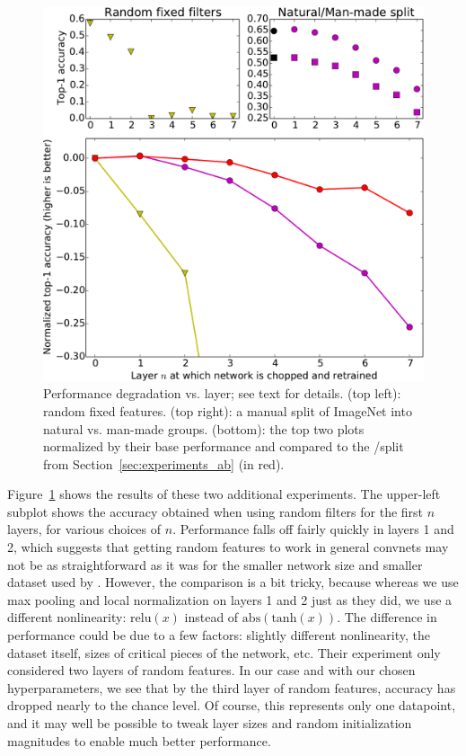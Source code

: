 \begin{figure}[t]
\begin{center}
\includegraphics[width=.65\linewidth]{plots/result_random_nm_combined_crop.pdf}
\end{center}
\caption{Performance degradation vs. layer; see text for details. (top left): random fixed features. (top right): a manual split of ImageNet into natural vs. man-made groups. (bottom): the top two plots normalized by their base performance and compared to the \dA/\dB split from Section~\ref{sec:experiments_ab} (in red).}
\label{fig:random_and_nm}
\end{figure}

Figure~\ref{fig:random_and_nm} shows the results of these two additional experiments. The upper-left subplot shows the accuracy obtained when using random filters for the first $n$ layers, for various choices of $n$. Performance falls off fairly quickly in layers 1 and 2, which suggests that getting random features to work in general convnets may not be as straightforward as it was for the smaller network size and smaller dataset used by \cite{Jarrett-ICCV2009}. However, the comparison is a bit tricky, because whereas we use max pooling and local normalization on layers 1 and 2 just as they did, we use a different nonlinearity: $\mathrm{relu}(x)$ instead of $\mathrm{abs}(\mathrm{tanh}(x))$. The difference in performance could be due to a few factors: slightly different nonlinearity, the dataset itself, sizes of critical pieces of the network, etc. Their experiment only considered two layers of random features. In our case and with our chosen hyperparameters, we see that by the third layer of random features, accuracy has dropped nearly to the chance level. Of course, this represents only one datapoint, and it may well be possible to tweak layer sizes and random initialization magnitudes to enable much better performance.

